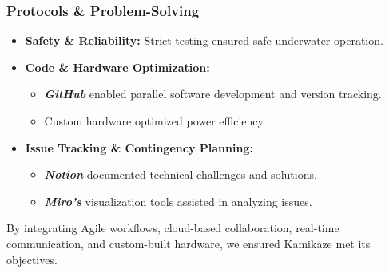 \subsubsection{Protocols \& Problem-Solving}
\vspace{-0.5\baselineskip}
\begin{itemize}[leftmargin=0pt, itemindent=20pt]
    \setlength{\itemsep}{0pt}
    \item \textbf{Safety \& Reliability:} Strict testing ensured safe underwater operation.
    \item \textbf{Code \& Hardware Optimization:}
    \vspace{-0.5\baselineskip}
    \begin{itemize}[leftmargin=0pt, itemindent=20pt]
        \setlength{\itemsep}{0pt}
        \item \textbf{\textit{GitHub}} enabled parallel software development and version tracking.
        \item Custom hardware optimized power efficiency.
    \end{itemize}
    \item \textbf{Issue Tracking \& Contingency Planning:}
    \vspace{-0.5\baselineskip}
    \begin{itemize}[leftmargin=0pt, itemindent=20pt]
        \setlength{\itemsep}{0pt}
        \item \textbf{\textit{Notion}} documented technical challenges and solutions.
        \item \textbf{\textit{Miro’s}} visualization tools assisted in analyzing issues.
    \end{itemize}
\end{itemize}

By integrating Agile workflows, cloud-based collaboration, real-time communication, and custom-built hardware, we ensured Kamikaze met its objectives.